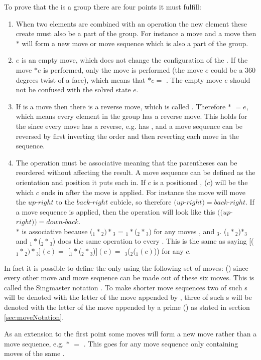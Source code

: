 To prove that the \rubik{} is a group there are four points it must fulfill:
\begin {enumerate}
\item When two elements are combined with an operation the new element these create must also be a part of the group. 
For instance a move  and a move  then $*$ will form a new move or move sequence which is also a part of the group.

\item $e$ is an empty move, which does not change the configuration of the \rubik{}. If the move $* e$ is performed, only the move  is performed (the move $e$ could be a 360 degrees twist of a face), which means that $*e=$ . The empty move $e$ should not be confused with the solved state $e$. 

\item If  is a move then there is a reverse move, which is called . Therefore $*$ $= e$, which means every element in the group has a reverse move. This holds for the \rubik{} since every move has a reverse, e.g.  has , and a move sequence can be reversed by first inverting the order and then reverting each move in the sequence. 

\item The operation must be associative meaning that the parentheses can be reordered without affecting the result. A move sequence can be defined as the orientation and position it puts each \cpiece{} in. If $c$ is a positioned \cubie{}, ($c$) will be the \cubicle{} which $c$ ends in after the move is applied. For instance the move  will move the $up$-$right$ \cubie{} to the $back$-$right$ cubicle, so therefore $(up$-$right)=back$-$right$. If a move sequence is applied, then the operation will look like this $($$(up$-$right))=down$-$back$.\\
$*$ is associative because ($_1*$$_2)*$$_3$ = $_1 *$($_2 *$$_3$) for any moves ,  and $_3$. ($_1 *$$_2$)$*$$_3$ and $_1 *$($_2 *$$_3$) does the same operation to every \cubie{}. This is the same as saying [($_1 *$$_2 )*$$_3$]$(c)=$ [$_1 *$($_2 *$$_3$)]$(c)=$ $_3$($_2$($_1 (c)$)) for any \cubie{} $c$.
\end {enumerate}

In fact it is possible to define the \rubik{} only using the following set of moves:
() since every other move and move sequence can be made out of these six moves.
This is called the Singmaster notation \cite[p. 7]{Joyner02}. To make shorter move sequences two of such \twist{}s will be denoted with the letter of the move appended by , three of such \twist{}s will be denoted with the letter of the move appended by a prime () as stated in section \ref{sec:moveNotation}.

As an extension to the first point some moves will form a new move rather than a move sequence, e.g. $*$ $=$ . This goes for any move sequence only containing moves of the same \face{}.